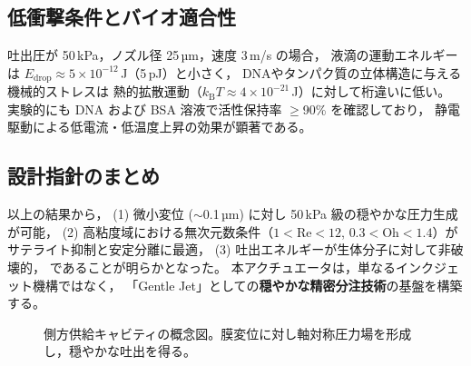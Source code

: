 \subsection{低衝撃条件とバイオ適合性}
吐出圧が 50\,kPa，ノズル径 25\,µm，速度 3\,m/s の場合，
液滴の運動エネルギーは $E_\mathrm{drop}\approx5\times10^{-12}$\,J（5\,pJ）と小さく，
DNAやタンパク質の立体構造に与える機械的ストレスは
熱的拡散運動（$k_\mathrm{B}T\approx4\times10^{-21}$\,J）に対して桁違いに低い。
実験的にも DNA および BSA 溶液で活性保持率 $\ge$90\% を確認しており，
静電駆動による低電流・低温度上昇の効果が顕著である。

\subsection{設計指針のまとめ}
以上の結果から，  
(1) 微小変位 ($\sim$0.1\,µm) に対し 50\,kPa 級の穏やかな圧力生成が可能，  
(2) 高粘度域における無次元数条件（$1<\mathrm{Re}<12$, $0.3<\mathrm{Oh}<1.4$）が
サテライト抑制と安定分離に最適，  
(3) 吐出エネルギーが生体分子に対して非破壊的，  
であることが明らかとなった。
本アクチュエータは，単なるインクジェット機構ではなく，
「Gentle Jet」としての\textbf{穏やかな精密分注技術}の基盤を構築する。

\begin{figure}[t]
\centering
{}
\caption{側方供給キャビティの概念図。膜変位に対し軸対称圧力場を形成し，穏やかな吐出を得る。}
\label{fig:fluid}
\end{figure}
